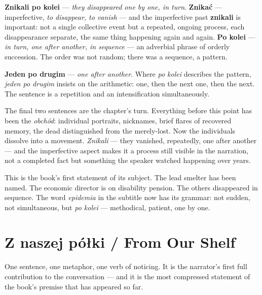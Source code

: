 \textbf{Znikali po kolei} --- \textit{they disappeared one
by one, in turn}. \textbf{Znikać} --- imperfective,
\textit{to disappear, to vanish} --- and the imperfective
past \textbf{znikali} is important: not a single collective
event but a repeated, ongoing process, each disappearance
separate, the same thing happening again and again.
\textbf{Po kolei} --- \textit{in turn, one after another,
in sequence} --- an adverbial phrase of orderly succession.
The order was not random; there was a sequence, a pattern.

\textbf{Jeden po drugim} --- \textit{one after another}.
Where \textit{po kolei} describes the pattern, \textit{jeden
po drugim} insists on the arithmetic: one, then the next
one, then the next. The sentence is a repetition and an
intensification simultaneously.

\medskip
The final two sentences are the chapter's turn. Everything
before this point has been the \textit{obchód}: individual
portraits, nicknames, brief flares of recovered memory,
the dead distinguished from the merely-lost. Now the
individuals dissolve into a movement. \textit{Znikali} ---
they vanished, repeatedly, one after another --- and the
imperfective aspect makes it a process still visible in
the narration, not a completed fact but something the
speaker watched happening over years.

This is the book's first statement of its subject. The
lead smelter has been named. The economic director is on
disability pension. The others disappeared in sequence.
The word \textit{epidemia} in the subtitle now has its
grammar: not sudden, not simultaneous, but \textit{po
kolei} --- methodical, patient, one by one.

\section{Z naszej półki / From Our Shelf}



One sentence, one metaphor, one verb of noticing. It is the
narrator's first full contribution to the conversation ---
and it is the most compressed statement of the book's premise
that has appeared so far.

